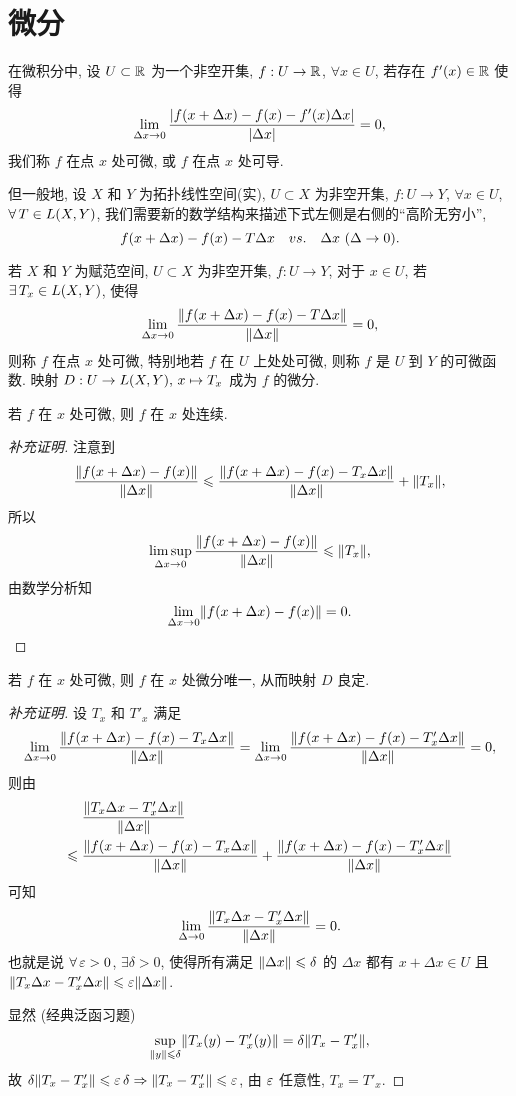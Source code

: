 \section{微分}
在微积分中, 设 $U\subset\mathbb{R}$ 为一个非空开集, $f:U\to\mathbb{R}$, $\forall x\in U$, 若存在 $f'\xk{x}\in\rr$ 使得 
\[\lim _{\Delta x\to 0}\frac{\jd{f\xk{x+\Delta x}-f\xk{x}-f'\xk{x}\Delta x}}{\jd{\Delta x}}=0,\]
我们称 $f$ 在点 $x$ 处可微, 或 $f$ 在点 $x$ 处可导.\par 
但一般地, 设 $X$ 和 $Y$ 为拓扑线性空间(实),  $U\subset X$ 为非空开集, $f:U\to Y$, $\forall x\in U$, $\forall T\in L\xk{X,Y}$, 我们需要新的数学结构来描述下式左侧是右侧的``高阶无穷小'',
\[f\xk{x+\Delta x}-f\xk{x}-T\Delta x\quad vs.\quad \Delta x\ (\Delta\to 0).\]
\begin{definition}
若 $X$ 和 $Y$ 为赋范空间, $U\subset X$ 为非空开集, $f:U\to Y$, 对于 $x\in U$, 若 $\exists T_{x}\in L\xk{X,Y}$, 使得
\[\lim _{\Delta x\to 0}\frac{\fs{f\xk{x+\Delta x}-f\xk{x}-T\Delta x}}{\fs{\Delta x}}=0,\]
则称 $f$ 在点 $x$ 处可微\rk, 特别地若 $f$ 在 $U$ 上处处可微, 则称 $f$ 是 $U$ 到 $Y$ 的可微函数. 映射 $D:U\to L\xk{X,Y},\,x\mapsto T_{x}$ 成为 $f$ 的微分.
\end{definition}
\begin{proposition}[补充 1]
若 $f$ 在 $x$ 处可微, 则 $f$ 在 $x$ 处连续.
\end{proposition}
\begin{proof}[补充证明]
注意到
\[\frac{\fs{f\xk{x+\Delta x}-f\xk{x}}}{\fs{\Delta x}}\leq\frac{\fs{f\xk{x+\Delta x}-f\xk{x}-T_{x}\Delta x}}{\fs{\Delta x}}+\fs{T_{x}},\]
所以
\[\limsup_{\Delta x\to 0}\frac{\fs{f\xk{x+\Delta x}-f\xk{x}}}{\fs{\Delta x}}\leq\fs{T_{x}},\]
由数学分析知
\begin{equation*}
\lim _{\Delta x\to 0}\fs{f\xk{x+\Delta x}-f\xk{x}}=0.\qedhere
\end{equation*}
\end{proof}
\begin{proposition}[补充 2]
若 $f$ 在 $x$ 处可微, 则 $f$ 在 $x$ 处微分唯一, 从而映射 $D$ 良定.
\end{proposition}
\begin{proof}[补充证明]
设 $T_{x}$ 和 $T'_{x}$ 满足
\[\lim _{\Delta x\to 0}\frac{\fs{f\xk{x+\Delta x}-f\xk{x}-T_{x}\Delta x}}{\fs{\Delta x}}=\lim _{\Delta x\to 0}\frac{\fs{f\xk{x+\Delta x}-f\xk{x}-T'_{x}\Delta x}}{\fs{\Delta x}}=0,\]
则由
\begin{align*}
&\; \frac{\fs{T_{x}\Delta x-T'_{x}\Delta x}}{\fs{\Delta x}}\\
\leq &\; \frac{\fs{f\xk{x+\Delta x}-f\xk{x}-T_{x}\Delta x}}{\fs{\Delta x}}+\frac{\fs{f\xk{x+\Delta x}-f\xk{x}-T_{x}'\Delta x}}{\fs{\Delta x}}
\end{align*}
可知
\[\lim _{\Delta\to 0}\frac{\left\Vert T_{x}\Delta x-T'_{x}\Delta x\right\Vert}{\left\Vert\Delta x\right\Vert}=0.\]
也就是说 $\forall\eps>0$, $\exists\delta>0$, 使得所有满足 $\left\Vert\Delta x\right\Vert\leqslant\delta$ 的 $\Delta x$ 都有 $x+\Delta x\in U$ 且 $\fs{T_{x}\Delta x-T'_{x}\Delta x}\leq\eps\fs{\Delta x}$.\par 
显然 (经典泛函习题)
\[\sup _{\fs{y}\leq\delta}\fs{T_{x}\xk{y}-T'_{x}\xk{y}}=\delta\fs{T_{x}-T'_{x}},\]
故 $\delta\fs{T_{x}-T'_{x}}\leq\eps\delta\Rightarrow\fs{T_{x}-T'_{x}}\leq\eps$, 由 $\operatorname{\varepsilon}$ 任意性, $T_{x}=T'_{x}$.
\end{proof}

